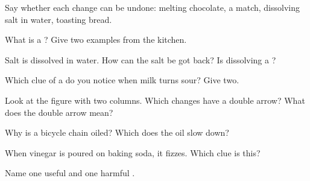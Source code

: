 \begin{exercise}[$\star$]\label{exo:g5:irreversible-changes:1}
Say whether each change can be undone: melting chocolate,  a
match, dissolving salt in water, toasting bread.
\end{exercise}

\begin{exercise}[$\star$]\label{exo:g5:irreversible-changes:2}
What is a ? Give two examples from the kitchen.
\end{exercise}

\begin{exercise}[$\star$]\label{exo:g5:irreversible-changes:3}
Salt is dissolved in water. How can the salt be got back? Is dissolving
a ?
\end{exercise}

\begin{exercise}[$\star$]\label{exo:g5:irreversible-changes:4}
Which clue of a  do you notice when milk turns sour?
Give two.
\end{exercise}

\begin{exercise}[$\star$]\label{exo:g5:irreversible-changes:5}
Look at the figure with two columns. Which changes have a double arrow?
What does the double arrow mean?
\end{exercise}

\begin{exercise}[$\star$]\label{exo:g5:irreversible-changes:6}
Why is a bicycle chain oiled? Which  does the oil slow
down?
\end{exercise}

\begin{exercise}[$\star$]\label{exo:g5:irreversible-changes:7}
When vinegar is poured on baking soda, it fizzes. Which clue is this?
\end{exercise}

\begin{exercise}[$\star$]\label{exo:g5:irreversible-changes:8}
Name one useful  and one harmful .
\end{exercise}

